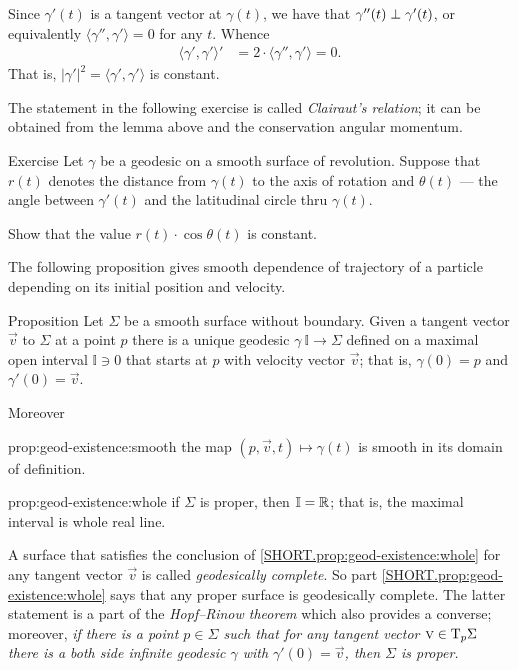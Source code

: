 Since $\gamma'(t)$ is a tangent vector at $\gamma(t)$,
we have that $\gamma''(t)\z\perp\gamma'(t)$, or equivalently $\langle\gamma'',\gamma'\rangle=0$ for any $t$.
Whence 
\begin{align*}
\langle\gamma',\gamma'\rangle'&=2\cdot \langle\gamma'',\gamma'\rangle=0.
\end{align*}
That is, $|\gamma'|^2=\langle\gamma',\gamma'\rangle$ is constant.
\qeds

The statement in the following exercise is called \emph{Clairaut's relation};
it can be obtained from the lemma above and the conservation angular momentum.

\begin{thm}{Exercise}\label{ex:clairaut}
Let $\gamma$ be a geodesic on a smooth surface of revolution.
Suppose that $r(t)$ denotes the distance from $\gamma(t)$ to the axis of rotation
and $\theta(t)$ --- the angle between $\gamma'(t)$ and the latitudinal circle thru $\gamma(t)$. 

Show that the value $r(t)\cdot \cos\theta(t)$ is constant. 
\end{thm}


The following proposition gives smooth dependence of trajectory of a particle depending on its initial position and velocity.


\begin{thm}{Proposition}\label{prop:geod-existence} 
Let $\Sigma$ be  a smooth surface without boundary.
Given a tangent vector ${\vec v}$ to $\Sigma$ at a point $p$
there is a unique geodesic $\gamma\:\mathbb{I}\to \Sigma$ defined on a maximal open interval $\mathbb{I}\ni 0$ that starts at $p$ with velocity vector ${\vec v}$;
that is, $\gamma(0)=p$ and $\gamma'(0)={\vec v}$.

Moreover
\begin{subthm}{prop:geod-existence:smooth} the map $(p,{\vec v},t)\mapsto \gamma(t)$ is smooth in its domain of definition.
\end{subthm}

\begin{subthm}{prop:geod-existence:whole} if $\Sigma$ is proper, then $\mathbb{I}=\mathbb{R}$; that is, the maximal interval is whole real line.
\end{subthm}

\end{thm}

A surface that satisfies the conclusion of \ref{SHORT.prop:geod-existence:whole} for any tangent vector ${\vec v}$ is called \emph{geodesically complete}.
So part \ref{SHORT.prop:geod-existence:whole} says that any proper surface is geodesically complete.
The latter statement is a part of the \emph{Hopf--Rinow theorem} \cite{hopf-rinow} which also provides a converse;
moreover, 
\emph{if there is a point $p\in \Sigma$ such that for any tangent vector ${\text{\sc{v}}}\in\mathrm{T}_p\Sigma$ there is a both side infinite geodesic $\gamma$ with $\gamma'(0)={\vec v}$, then $\Sigma$ is proper.}

